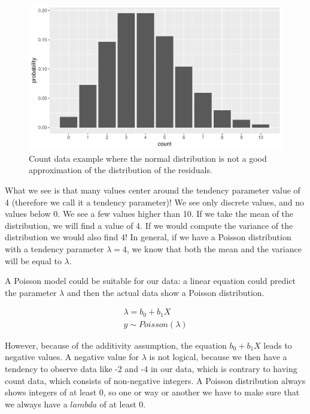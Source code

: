 \documentclass[]{report}\usepackage[]{graphicx}\usepackage[]{color}
\makeatletter
\def\maxwidth{ %
  \ifdim\Gin@nat@width>\linewidth
    \linewidth
  \else
    \Gin@nat@width
  \fi
}
\newenvironment{knitrout}{}{} %
\makeatother
\begin{document}
\begin{knitrout}
\color{fgcolor}\begin{figure}

{\centering \includegraphics[width=\maxwidth]{figure/gen_15-1} 

}

\caption[Count data example where the normal distribution is not a good approximation of the distribution of the residuals]{Count data example where the normal distribution is not a good approximation of the distribution of the residuals.}\label{fig:gen_15}
\end{figure}


\end{knitrout}

What we see is that many values center around the tendency parameter value of 4 (therefore we call it a tendency parameter)! We see only discrete values, and no values below 0. We see a few values higher than 10. If we take the mean of the distribution, we will find a value of 4. If we would compute the variance of the distribution we would also find 4! In general, if we have a Poisson distribution with a tendency parameter $\lambda=4$, we know that both the mean and the variance will be equal to $\lambda$.

A Poisson model could be suitable for our data: a linear equation could predict the parameter $\lambda$ and then the actual data show a Poisson distribution.


\begin{eqnarray}
\lambda = b_0 + b_1 X \\
y \sim Poisson(\lambda)
\end{eqnarray}

However, because of the additivity assumption, the equation $b_0 + b_1 X$ leads to negative values. A negative value for $\lambda$ is not logical, because we then have a tendency to observe data like -2 and -4 in our data, which is contrary to having count data, which consists of non-negative integers. A Poisson distribution always shows integers of at least 0, so one or way or another we have to make sure that we always have a $lambda$ of at least 0.
\end{document}
